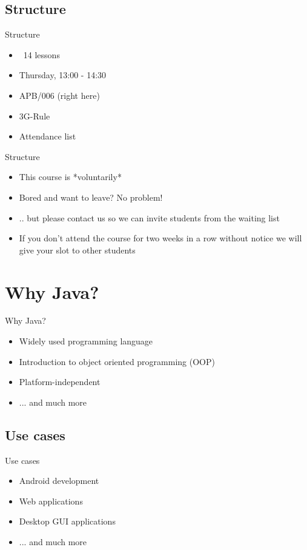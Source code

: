 \subsection{Structure}
\begin{frame}{Structure}
	\begin{itemize}[<+->]
		\item ~14 lessons
		\item Thursday, 13:00 - 14:30
		\item APB/006 (right here)
		\item 3G-Rule
		\item Attendance list
	\end{itemize}
\end{frame}

\begin{frame}{Structure}
	\begin{itemize}[<+->]
		\item This course is *voluntarily*
		\item Bored and want to leave? No problem!
		\item[]	.. but please contact us so we can invite students from the waiting list
		\item If you don't attend the course for two weeks in a row without notice we will give your slot to other students
	\end{itemize}
\end{frame}


\section{Why Java?}
\begin{frame}{Why Java?}
	\begin{itemize}
		\item Widely used programming language
		\item Introduction to object oriented programming (OOP)
		\item Platform-independent
		\item ... and much more
	\end{itemize}
\end{frame}

\subsection{Use cases}
\begin{frame}{Use cases}
	\begin{itemize}
		\item Android development
		\item Web applications
		\item Desktop GUI applications
		\item ... and much more
	\end{itemize}
\end{frame}


